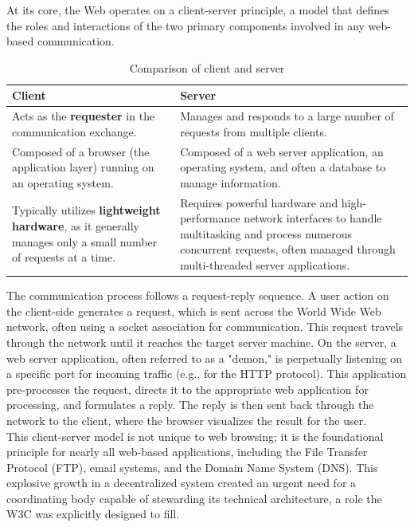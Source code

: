 \documentclass{scrbook}
\begin{document}
At its core, the Web operates on a client-server principle, a model that defines the roles and interactions of the two primary components involved in any web-based communication.

\begin{table}[h!]
    \centering
    \begin{tabularx}{\textwidth}{|X|X|} \hline
        \textbf{Client} & \textbf{Server}
        \\ \hline

        Acts as the \textbf{requester} in the communication exchange. &
        Manages and responds to a large number of requests from multiple clients.
        \\ \hline

        Composed of a browser (the application layer) running on an operating system. &
        Composed of a web server application, an operating system, and often a database to manage information.
        \\ \hline

        Typically utilizes \textbf{lightweight hardware}, as it generally manages only a small number of requests at a time. &
        Requires powerful hardware and high-performance network interfaces to handle multitasking and process numerous concurrent requests, often managed through multi-threaded server applications.
        \\ \hline
    \end{tabularx}
    \caption{Comparison of client and server}
\end{table}

The communication process follows a request-reply sequence. A user action on the client-side generates a request, which is sent across the World Wide Web network, often using a socket association for communication. This request travels through the network until it reaches the target server machine. On the server, a web server application, often referred to as a "demon," is perpetually listening on a specific port for incoming traffic (e.g., for the HTTP protocol). This application pre-processes the request, directs it to the appropriate web application for processing, and formulates a reply. The reply is then sent back through the network to the client, where the browser visualizes the result for the user. \\

This client-server model is not unique to web browsing; it is the foundational principle for nearly all web-based applications, including the File Transfer Protocol (FTP), email systems, and the Domain Name System (DNS). This explosive growth in a decentralized system created an urgent need for a coordinating body capable of stewarding its technical architecture, a role the W3C was explicitly designed to fill.
\end{document}
